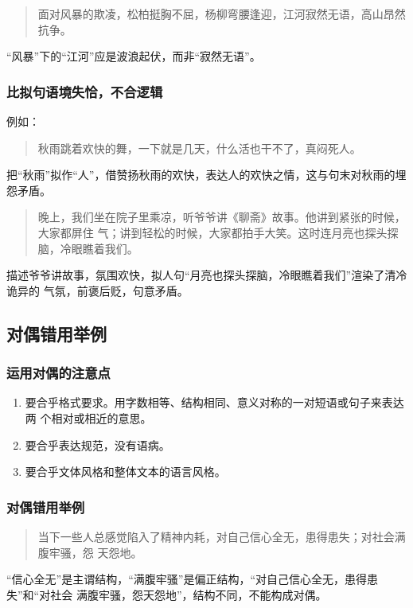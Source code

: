 \documentclass[final,oneside]{ctexbook}
\newenvironment{equotation}{\begin{quotation}\kaishu}{\end{quotation}}
\begin{document}
\begin{equotation}
  面对风暴的欺凌，松柏挺胸不屈，杨柳弯腰逢迎，江河寂然无语，高山昂然抗争。
\end{equotation}
“风暴”下的“江河”应是波浪起伏，而非“寂然无语”。

\subsubsection{比拟句语境失恰，不合逻辑}

例如：

\begin{equotation}
  秋雨跳着欢快的舞，一下就是几天，什么活也干不了，真闷死人。
\end{equotation}
把“秋雨”拟作“人”，借赞扬秋雨的欢快，表达人的欢快之情，这与句末对秋雨的埋怨矛盾。

\begin{equotation}
  晚上，我们坐在院子里乘凉，听爷爷讲《聊斋》故事。他讲到紧张的时候，大家都屏住
  气；讲到轻松的时候，大家都拍手大笑。这时连月亮也探头探脑，冷眼瞧着我们。
\end{equotation}
描述爷爷讲故事，氛围欢快，拟人句“月亮也探头探脑，冷眼瞧着我们”渲染了清冷诡异的
气氛，前褒后贬，句意矛盾。

\subsection{对偶错用举例}

\subsubsection{运用对偶的注意点}

\begin{enumerate}
  \item 要合乎格式要求。用字数相等、结构相同、意义对称的一对短语或句子来表达两
    个相对或相近的意思。

  \item 要合乎表达规范，没有语病。

  \item 要合乎文体风格和整体文本的语言风格。
\end{enumerate}

\subsubsection{对偶错用举例}

\begin{equotation}
  当下一些人总感觉陷入了精神内耗，对自己信心全无，患得患失；对社会满腹牢骚，怨
  天怨地。
\end{equotation}
“信心全无”是主谓结构，“满腹牢骚”是偏正结构，“对自己信心全无，患得患失”和“对社会
满腹牢骚，怨天怨地”，结构不同，不能构成对偶。
\end{document}
